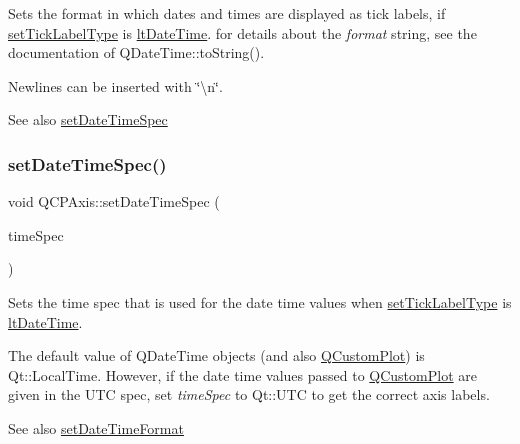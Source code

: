 Sets the format in which dates and times are displayed as tick labels, if \mbox{\hyperlink{class_q_c_p_axis_a54f24f5ce8feea25209388a863d7e448}{set\+Tick\+Label\+Type}} is \mbox{\hyperlink{class_q_c_p_axis_a4a7da0166f755f5abac23b765d184cadafc70594a9d877124dd11ccc187d4ac52}{lt\+Date\+Time}}. for details about the {\itshape format} string, see the documentation of Q\+Date\+Time\+::to\+String().

Newlines can be inserted with \char`\"{}\textbackslash{}n\char`\"{}.

\begin{DoxySeeAlso}{See also}
\mbox{\hyperlink{class_q_c_p_axis_a262e06731debed7eee11fa6a81d67eaf}{set\+Date\+Time\+Spec}} 
\end{DoxySeeAlso}
\mbox{\label{class_q_c_p_axis_a262e06731debed7eee11fa6a81d67eaf}} 
\subsubsection{\texorpdfstring{set\+Date\+Time\+Spec()}{setDateTimeSpec()}}
{\footnotesize\ttfamily void Q\+C\+P\+Axis\+::set\+Date\+Time\+Spec (\begin{DoxyParamCaption}\item[{const Qt\+::\+Time\+Spec \&}]{time\+Spec }\end{DoxyParamCaption})}

Sets the time spec that is used for the date time values when \mbox{\hyperlink{class_q_c_p_axis_a54f24f5ce8feea25209388a863d7e448}{set\+Tick\+Label\+Type}} is \mbox{\hyperlink{class_q_c_p_axis_a4a7da0166f755f5abac23b765d184cadafc70594a9d877124dd11ccc187d4ac52}{lt\+Date\+Time}}.

The default value of Q\+Date\+Time objects (and also \mbox{\hyperlink{class_q_custom_plot}{Q\+Custom\+Plot}}) is {\ttfamily Qt\+::\+Local\+Time}. However, if the date time values passed to \mbox{\hyperlink{class_q_custom_plot}{Q\+Custom\+Plot}} are given in the U\+TC spec, set {\itshape time\+Spec} to {\ttfamily Qt\+::\+U\+TC} to get the correct axis labels.

\begin{DoxySeeAlso}{See also}
\mbox{\hyperlink{class_q_c_p_axis_a2ee0191daa03524a682113e63e05f7a7}{set\+Date\+Time\+Format}} 
\end{DoxySeeAlso}
\mbox{\label{class_q_c_p_axis_a33bcc382c111c9f31bb0687352a2dea4}} 
